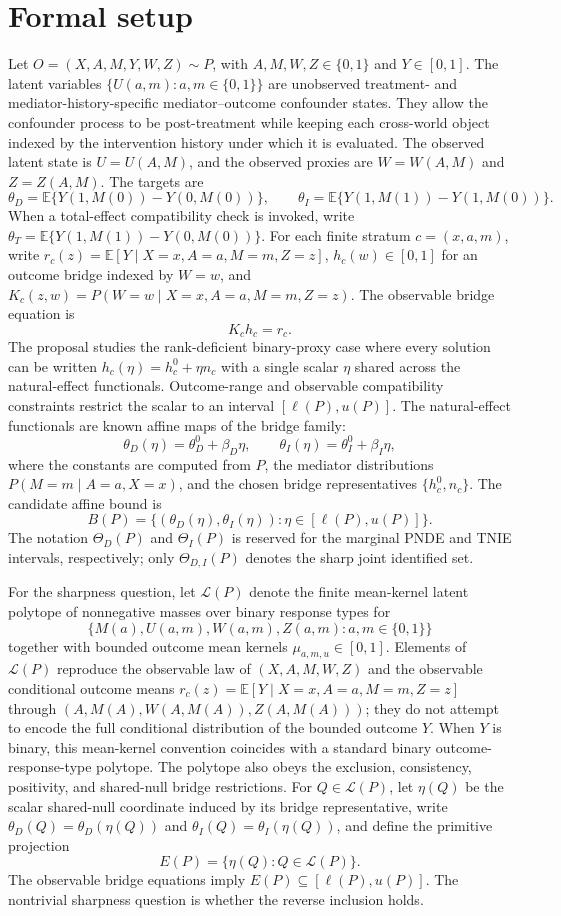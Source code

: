 \documentclass[11pt]{article}
\newcommand{\E}{\mathbb{E}}
\theoremstyle{definition}
\theoremstyle{plain}
\theoremstyle{remark}
\begin{document}
\section{Formal setup}
Let \(O=(X,A,M,Y,W,Z)\sim P\), with \(A,M,W,Z\in\{0,1\}\) and
\(Y\in[0,1]\).  The latent variables
\(\{U(a,m):a,m\in\{0,1\}\}\) are unobserved treatment- and
mediator-history-specific mediator--outcome confounder states.  They allow the
confounder process to be post-treatment while keeping each cross-world object
indexed by the intervention history under which it is evaluated.  The
observed latent state is \(U=U(A,M)\), and the observed proxies are
\(W=W(A,M)\) and \(Z=Z(A,M)\).  The targets are
\[
  \theta_D=\E\{Y(1,M(0))-Y(0,M(0))\}, \qquad
  \theta_I=\E\{Y(1,M(1))-Y(1,M(0))\}.
\]
When a total-effect compatibility check is invoked, write
\(\theta_T=\E\{Y(1,M(1))-Y(0,M(0))\}\).
For each finite stratum \(c=(x,a,m)\), write \(r_c(z)=\E[Y\mid
X=x,A=a,M=m,Z=z]\), \(h_c(w)\in[0,1]\) for an outcome bridge indexed by
\(W=w\), and \(K_c(z,w)=P(W=w\mid X=x,A=a,M=m,Z=z)\).  The observable bridge
equation is
\[
  K_c h_c = r_c.
\]
The proposal studies the rank-deficient binary-proxy case where every
solution can be written \(h_c(\eta)=h_c^0+\eta n_c\) with a single scalar
\(\eta\) shared across the natural-effect functionals.  Outcome-range and
observable compatibility constraints restrict the scalar to an interval
\([\ell(P),u(P)]\).  The natural-effect functionals are known affine maps of
the bridge family:
\[
  \theta_D(\eta)=\theta_D^0+\beta_D\eta,\qquad
  \theta_I(\eta)=\theta_I^0+\beta_I\eta,
\]
where the constants are computed from \(P\), the mediator distributions
\(P(M=m\mid A=a,X=x)\), and the chosen bridge representatives
\(\{h_c^0,n_c\}\).  The candidate affine bound is
\[
  B(P)=\{(\theta_D(\eta),\theta_I(\eta)):
      \eta\in[\ell(P),u(P)]\}.
\]
The notation \(\Theta_D(P)\) and \(\Theta_I(P)\) is reserved for the marginal
PNDE and TNIE intervals, respectively; only \(\Theta_{D,I}(P)\) denotes the
sharp joint identified set.

For the sharpness question, let \(\mathcal{L}(P)\) denote the finite
mean-kernel latent polytope of nonnegative masses over binary response types
for
\[
  \{M(a),U(a,m),W(a,m),Z(a,m):a,m\in\{0,1\}\}
\]
together with bounded outcome mean kernels
\(\mu_{a,m,u}\in[0,1]\).  Elements of \(\mathcal{L}(P)\) reproduce the
observable law of \((X,A,M,W,Z)\) and the observable conditional outcome means
\(r_c(z)=\E[Y\mid X=x,A=a,M=m,Z=z]\) through
\((A,M(A),W(A,M(A)),Z(A,M(A)))\); they do not attempt to encode the full
conditional distribution of the bounded outcome \(Y\).  When \(Y\) is binary,
this mean-kernel convention coincides with a standard binary
outcome-response-type polytope.  The polytope also obeys the exclusion,
consistency, positivity, and shared-null bridge restrictions.
For \(Q\in\mathcal{L}(P)\), let \(\eta(Q)\) be the scalar shared-null
coordinate induced by its bridge representative, write
\(\theta_D(Q)=\theta_D(\eta(Q))\) and
\(\theta_I(Q)=\theta_I(\eta(Q))\), and define the primitive projection
\[
  E(P)=\{\eta(Q):Q\in\mathcal{L}(P)\}.
\]
The observable bridge equations imply \(E(P)\subseteq[\ell(P),u(P)]\).  The
nontrivial sharpness question is whether the reverse inclusion holds.
\end{document}
